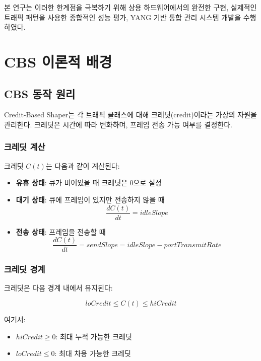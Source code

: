 \documentclass[twocolumn,10pt]{article}
\begin{document}
본 연구는 이러한 한계점을 극복하기 위해 상용 하드웨어에서의 완전한 구현, 실제적인 트래픽 패턴을 사용한 종합적인 성능 평가, YANG 기반 통합 관리 시스템 개발을 수행하였다.

\section{CBS 이론적 배경}
\label{sec:theory}

\subsection{CBS 동작 원리}

Credit-Based Shaper는 각 트래픽 클래스에 대해 크레딧(credit)이라는 가상의 자원을 관리한다. 크레딧은 시간에 따라 변화하며, 프레임 전송 가능 여부를 결정한다.

\subsubsection{크레딧 계산}

크레딧 $C(t)$는 다음과 같이 계산된다:

\begin{itemize}
    \item \textbf{유휴 상태}: 큐가 비어있을 때 크레딧은 0으로 설정
    \item \textbf{대기 상태}: 큐에 프레임이 있지만 전송하지 않을 때
    \begin{equation}
    \frac{dC(t)}{dt} = idleSlope
    \end{equation}
    \item \textbf{전송 상태}: 프레임을 전송할 때
    \begin{equation}
    \frac{dC(t)}{dt} = sendSlope = idleSlope - portTransmitRate
    \end{equation}
\end{itemize}

\subsubsection{크레딧 경계}

크레딧은 다음 경계 내에서 유지된다:

\begin{equation}
loCredit \leq C(t) \leq hiCredit
\end{equation}

여기서:
\begin{itemize}
    \item $hiCredit \geq 0$: 최대 누적 가능한 크레딧
    \item $loCredit \leq 0$: 최대 차용 가능한 크레딧
\end{itemize}
\end{document}
